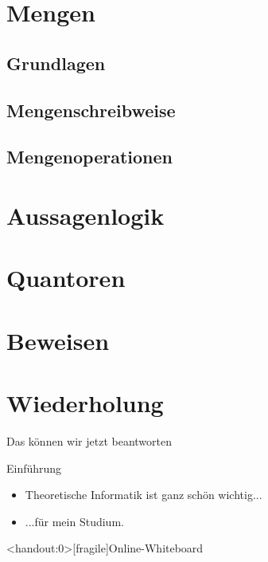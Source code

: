 
\section{Mengen}
\subsection{Grundlagen}


\subsection{Mengenschreibweise}


\subsection{Mengenoperationen}



\section{Aussagenlogik}


\section{Quantoren}


\section{Beweisen}


\section{Wiederholung}
\begin{frame}[fragile]{Das können wir jetzt beantworten}
	\begin{alertblock}{Einführung}
		\begin{itemize}
			\item Theoretische Informatik ist ganz schön wichtig...
			\item ...für mein Studium.
		\end{itemize}
	\end{alertblock}
\end{frame}










\appendix

\begin{frame}<handout:0>[fragile]{Online-Whiteboard}
	\phantom{text}
\end{frame}


